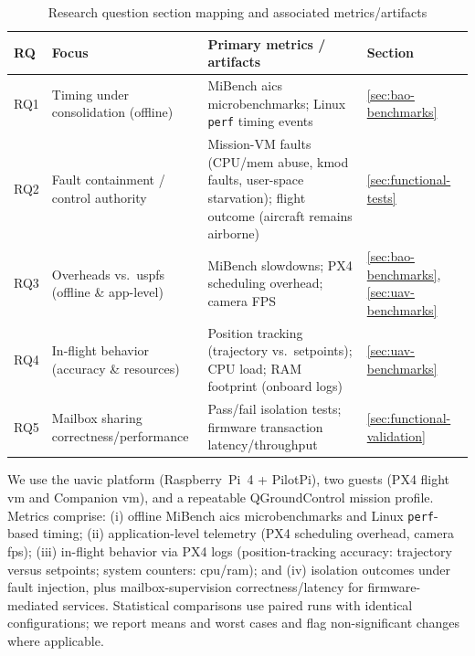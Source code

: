 \begin{table}[t]
  \centering
  \caption{Research question section mapping and associated metrics/artifacts}
  \label{tab:rq-map}
  \begingroup
  \footnotesize
  \setlength{\extrarowheight}{0.6ex}
  \begin{tabular}{@{}llp{6.8cm}l@{}}
  \toprule
  \textbf{RQ} & \textbf{Focus} & \textbf{Primary metrics / artifacts} & \textbf{Section} \\
  \midrule
  RQ1 & Timing under consolidation (offline) &
   MiBench \gls{aics} microbenchmarks; Linux \texttt{perf} timing events &
  \ref{sec:bao-benchmarks} \\
  RQ2 & Fault containment / control authority &
  Mission-VM faults (CPU/mem abuse, kmod faults, user-space starvation); flight outcome (aircraft remains airborne) &
  \ref{sec:functional-tests} \\
  RQ3 & Overheads vs.\ \gls{uspfs} (offline \& app-level) &
  MiBench slowdowns; PX4 scheduling overhead; camera FPS &
  \ref{sec:bao-benchmarks}, \ref{sec:uav-benchmarks} \\
  RQ4 & In-flight behavior (accuracy \& resources) &
  Position tracking (trajectory vs.\ setpoints); CPU load; RAM footprint (onboard logs) &
  \ref{sec:uav-benchmarks} \\
  RQ5 & Mailbox sharing correctness/performance &
  Pass/fail isolation tests; firmware transaction latency/throughput &
  \ref{sec:functional-validation} \\
  \bottomrule
  \end{tabular}
  \endgroup
\end{table}

We use the \gls{uavic} platform (Raspberry~Pi~4 + PilotPi), two guests (PX4 flight \gls{vm} and Companion \gls{vm}), and a repeatable QGroundControl mission profile. 
Metrics comprise: (i) offline MiBench \gls{aics} microbenchmarks and Linux \texttt{perf}-based timing; 
(ii) application-level telemetry (PX4 scheduling overhead, camera \gls{fps}); 
(iii) in-flight behavior via PX4 logs (position-tracking accuracy: trajectory versus setpoints; system counters: \gls{cpu}/\gls{ram}); and 
(iv) isolation outcomes under fault injection, plus mailbox-supervision correctness/latency for firmware-mediated services. 
Statistical comparisons use paired runs with identical configurations; we report
means and worst cases and flag non-significant changes where applicable.

